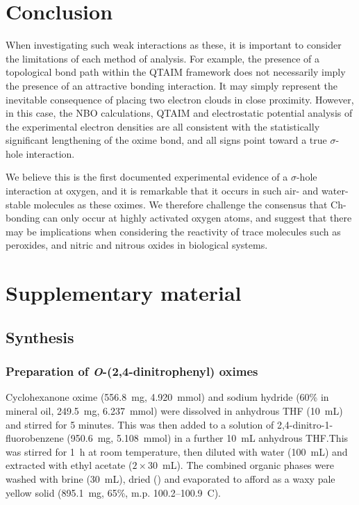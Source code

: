 \begin{refsection}
\section{Conclusion}
When investigating such weak interactions as these, it is important to consider the limitations of each method of analysis.
For example, the presence of a topological bond path within the QTAIM framework does not necessarily imply the presence of an attractive bonding interaction.
It may simply represent the inevitable consequence of placing two electron clouds in close proximity.\autocite{Spackman1999,Gatti2005,Bader2009,Cerpa2008,Cerpa2009}
However, in this case, the NBO calculations, QTAIM and electrostatic potential analysis of the experimental electron densities are all consistent with the statistically significant lengthening of the oxime  bond, and all signs point toward a true $\sigma$-hole interaction.

We believe this is the first documented experimental evidence of a $\sigma$-hole interaction at oxygen, and it is remarkable that it occurs in such air- and water-stable molecules as these oximes.
We therefore challenge the consensus that Ch-bonding can only occur at highly activated oxygen atoms, and suggest that there may be implications when considering the reactivity of trace molecules such as peroxides, and nitric and nitrous oxides in biological systems.

\section{Supplementary material}

\subsection{Synthesis}

\subsubsection[Preparation of \refcmpd{cyclohexanone-oxime-dnp,acetone-oxime-dnp}]{Preparation of \emph{O}-(2,4-dinitrophenyl) oximes }
Cyclohexanone oxime (556.8~mg, 4.920~mmol) and sodium hydride (60\% in mineral oil, 249.5~mg, 6.237~mmol) were dissolved in anhydrous THF (10~mL) and stirred for 5 minutes. This was then added to a solution of 2,4-dinitro-1-fluorobenzene (950.6~mg, 5.108~mmol) in a further 10~mL anhydrous THF.\@ This was stirred for 1~h at room temperature, then diluted with water (100~mL) and extracted with ethyl acetate ($2\times30$~mL). The combined organic phases were washed with brine (30~mL), dried () and evaporated to afford  as a waxy pale yellow solid (895.1~mg, 65\%, m.p. 100.2--100.9\degree~C).


\end{refsection}
